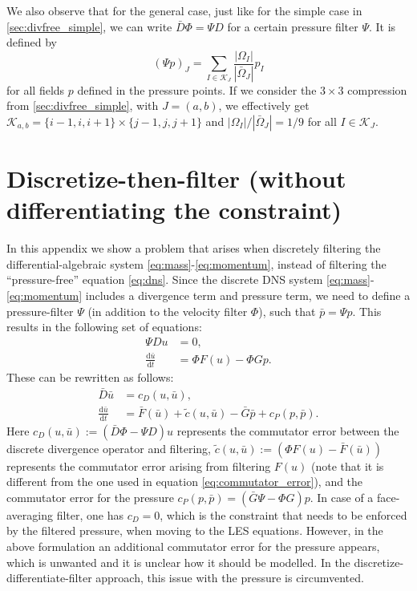 \documentclass[preprint]{elsarticle}
\begin{document}
We also observe that for the general case, just like for the simple case in
\ref{sec:divfree_simple}, we can write $\bar{D} \Phi = \Psi D$ for a certain
pressure filter $\Psi$. It is defined by
\begin{equation}
    (\Psi p)_J =
    \sum_{I \in \mathcal{K}_J}
    \frac{| \Omega_I |}{| \bar{\Omega}_J |}
    p_I
\end{equation}
for all fields $p$ defined in the pressure points. If we consider the $3 \times
3$ compression from \ref{sec:divfree_simple}, with $J = (a, b)$, we
effectively get $\mathcal{K}_{a, b} = \{i - 1, i, i + 1\} \times \{j - 1, j, j +
1\}$ and $| \Omega_I | / | \bar{\Omega}_J | = 1 / 9$ for all $I \in
\mathcal{K}_J$.

\section{Discretize-then-filter (without differentiating the constraint)} \label{sec:discretize_filter}

In this appendix we show a problem that arises when discretely filtering the differential-algebraic system
\eqref{eq:mass}-\eqref{eq:momentum}, instead of filtering the ``pressure-free'' equation \eqref{eq:dns}. 
Since the discrete DNS system \eqref{eq:mass}-\eqref{eq:momentum} includes a divergence term and pressure term, we need to define a pressure-filter $\Psi$ (in addition to the velocity filter $\Phi$), such that $\bar{p} = \Psi p$. This results in the following set of equations:
\begin{align}
    \Psi D u & = 0, \\
    \frac{\mathrm{d} \bar{u}}{\mathrm{d} t} & = \Phi F(u) - \Phi G p.
\end{align}
These can be rewritten as follows:
\begin{align}
    \bar{D} \bar{u} & = c_{D}(u,\bar{u}),  \\
    \frac{\mathrm{d} \bar{u}}{\mathrm{d} t} & = \bar{F}(\bar{u}) + \tilde{c}(u,\bar{u}) - \bar{G} \bar{p} + c_{P}(p,\bar{p}) .
\end{align}
Here $c_{D}(u,\bar{u}) := (\bar{D} \Phi - \Psi D) u$ represents the commutator error between the discrete divergence operator and filtering, $\tilde{c} (u,\bar{u}) := (\Phi F(u) - \bar{F}(\bar{u}))$ represents the commutator error arising from filtering $F(u)$ (note that it is different from the one used in equation \eqref{eq:commutator_error}), and the commutator error for the pressure $c_{P} (p,\bar{p}) = (\bar{G} \Psi - \Phi G) p$. 
In case of a face-averaging filter, one has $c_{D} = 0$, which is the constraint that needs to be enforced by the filtered pressure, when moving to the LES equations. However, in the above formulation an additional commutator error for the pressure appears, which is unwanted and it is unclear how it should be modelled. In the discretize-differentiate-filter approach, this issue with the pressure is circumvented.
\end{document}
